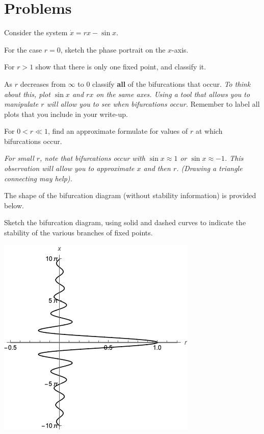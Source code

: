 \documentclass[12pt,letterpaper]{exam}
\begin{document}
\section*{Problems}
\begin{questions}

\question Consider the system $\dot{x} = rx - \sin x$. 
\begin{parts}
\item For the case $r=0$, sketch the phase portrait on the $x$-axis.
\item For $r>1$ show that there is only one fixed point, and classify it.
\item As $r$ decreases from $\infty$ to $0$ classify \textbf{all} of the bifurcations that occur.  \emph{To think about this, plot $\sin x$ and $r x$ on the same axes.  Using a tool that allows you to manipulate $r$ will allow you to see when bifurcations occur.}  Remember to label all plots that you include in your write-up.
\item For $0<r\ll 1$, find an approximate formulate for values of $r$ at which bifurcations occur.

\emph{For small $r$, note that bifurcations occur with $\sin x \approx 1$ or $\sin x \approx -1$.  This observation will allow you to approximate $x$ and then $r$.  (Drawing a triangle connecting may help).}
\item The shape of the bifurcation diagram (without stability information) is provided below.

Sketch the bifurcation diagram, using solid and dashed curves to indicate the stability of the various branches of fixed points.

\includegraphics[scale=0.9]{img/PSet02-rxsinx-bifn.png}



\end{parts}
\end{questions}
\end{document}
